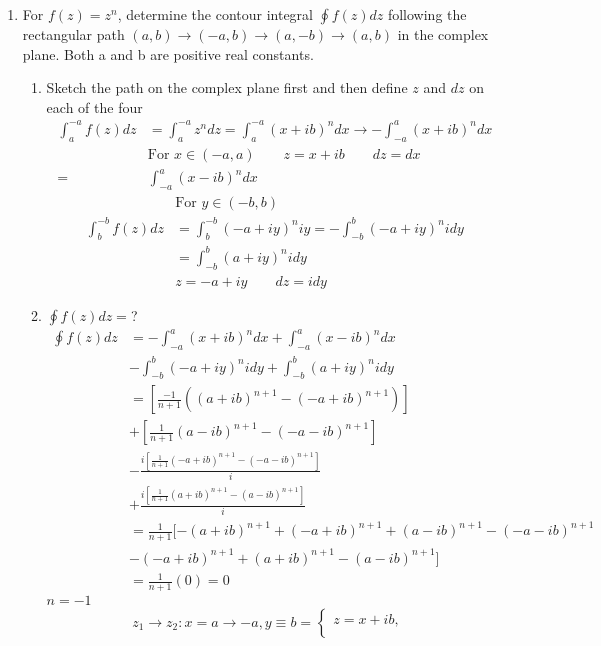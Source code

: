 \documentclass[12pt]{article}
\begin{document}
\begin{enumerate}
	\item 
		For $f(z) = z^{n}$, determine the contour integral $\oint f(z)dz$ following the rectangular path $(a,b) \rightarrow (-a,b) \rightarrow (a,-b) \rightarrow (a,b) $ in the complex plane. Both a and b are positive real constants.
		\begin{enumerate}
		    \item Sketch the path on the complex plane first and then define $z$ and $dz$ on each of the four
			    \begin{align*}
				    \int_{a}^{-a}f(z)dz&=\int_{a}^{-a}z^{n}dz=\int_{a}^{-a}(x+ib)^{n}dx \rightarrow -\int_{-a}^{a}(x+ib)^{n}dx\\
						       &\text{For $x \in (-a,a)$} \qquad z=x+ib \qquad dz=dx\\
				    =&\int_{-a}^{a}(x-ib)^{n}dx
			    \end{align*}
			    \begin{align*}
				    &\text{For $y\in(-b,b)$}\\
				    \int_{b}^{-b}f(z)dz&=\int_{b}^{-b}(-a+iy)^{n}iy=-\int_{-b}^{b}(-a+iy)^{n}idy\\
						       &= \int_{-b}^{b}(a+iy)^{n}idy\\
						       &z=-a+iy \qquad dz=idy
			    \end{align*}
		\item $\oint f(z)dz=$?
			\begin{align*}
				\oint f(z)dz&= -\int_{-a}^{a}(x+ib)^{n}dx+\int_{-a}^{a}(x-ib)^{n}dx\\
					    &-\int_{-b}^{b}(-a+iy)^{n}idy+\int_{-b}^{b}(a+iy)^{n}idy\\
					    &=[\frac{-1}{n+1}((a+ib)^{n+1}-(-a+ib)^{n+1})]\\
					    &+[\frac{1}{n+1}(a-ib)^{n+1}-(-a-ib)^{n+1}]\\
					    &-\frac{i[\frac{1}{n+1}(-a+ib)^{n+1}-(-a-ib)^{n+1}]}{i}\\
					    &+\frac{i[\frac{1}{n+1}(a+ib)^{n+1}-(a-ib)^{n+1}]}{i}\\
					    &=\frac{1}{n+1}[-(a+ib)^{n+1}+(-a+ib)^{n+1}+(a-ib)^{n+1}-(-a-ib)^{n+1}\\
					    &-(-a+ib)^{n+1}+(a+ib)^{n+1}-(a-ib)^{n+1}]\\
					    &=\frac{1}{n+1}(0)=0
			\end{align*}
			$n=-1$
			\begin{align*}
			        {z_{1}\rightarrow z_{2}: x=a\rightarrow -a, y \equiv b} = \begin{cases}
			        {z=x+ib}, & \\

\end{cases}
\end{align*}
\end{enumerate}
\end{enumerate}
\end{document}
